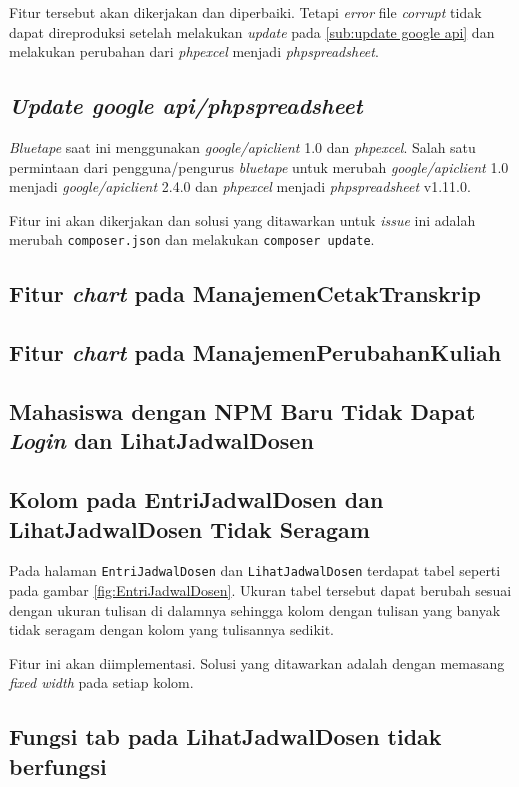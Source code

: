 Fitur tersebut akan dikerjakan dan diperbaiki. Tetapi \textit{error} file \textit{corrupt} tidak dapat direproduksi setelah melakukan \textit{update} pada \ref{sub:update google api} dan melakukan perubahan dari \textit{phpexcel} menjadi \textit{phpspreadsheet}. 

\subsection{\textit{Update google api/phpspreadsheet}}
\textit{Bluetape} saat ini menggunakan \textit{google/apiclient} 1.0 dan \textit{phpexcel}. Salah satu permintaan dari pengguna/pengurus \textit{bluetape} untuk merubah \textit{google/apiclient} 1.0 menjadi \textit{google/apiclient} 2.4.0 dan \textit{phpexcel} menjadi \textit{phpspreadsheet} v1.11.0. 

Fitur ini akan dikerjakan dan solusi yang ditawarkan untuk \textit{issue} ini adalah merubah \texttt{composer.json} dan melakukan \texttt{composer update}.
\label{sub:update google api}

\subsection{Fitur \textit{chart} pada ManajemenCetakTranskrip}
\subsection{Fitur \textit{chart} pada ManajemenPerubahanKuliah}
\subsection{Mahasiswa dengan NPM Baru Tidak Dapat \textit{Login} dan LihatJadwalDosen}
\subsection{Kolom pada EntriJadwalDosen dan LihatJadwalDosen Tidak Seragam} 
Pada halaman \texttt{EntriJadwalDosen} dan \texttt{LihatJadwalDosen} terdapat tabel seperti pada gambar \ref{fig:EntriJadwalDosen}. Ukuran tabel tersebut dapat berubah sesuai dengan ukuran tulisan di dalamnya sehingga kolom dengan tulisan yang banyak tidak seragam dengan kolom yang tulisannya sedikit.

Fitur ini akan diimplementasi. Solusi yang ditawarkan adalah dengan memasang \textit{fixed width} pada setiap kolom.

\subsection{Fungsi tab pada LihatJadwalDosen tidak berfungsi}
